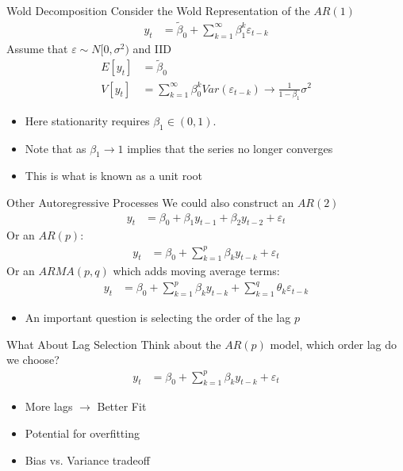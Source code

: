 \documentclass[aspectratio=169]{beamer}
\begin{document}
\begin{frame}{Wold Decomposition}
Consider the Wold Representation of the $AR(1)$
\begin{align*}
y_t &= \widetilde{\beta}_0 + \sum_{k=1}^{\infty} \beta_1^{k} \varepsilon_{t-k}
\end{align*}
Assume that $\varepsilon \sim N[0,\sigma^2)$ and IID
\begin{align*}
E[y_t] &= \widetilde{\beta}_0 \\
V[y_t] &= \sum_{k=1}^{\infty} \beta_0^{k} Var(\varepsilon_{t-k})  \rightarrow \frac{1}{1-\beta_1} \sigma^2 
\end{align*}
\begin{itemize}
    \item Here \alert{stationarity} requires $\beta_1 \in (0,1)$.
    \item Note that as $\beta_1 \rightarrow 1$ implies that the series no longer converges
    \item This is what is known as a \alert{unit root}
\end{itemize}
\end{frame}

\begin{frame}{Other Autoregressive Processes}
We could also construct an $AR(2)$
\begin{align*}
y_t &= \beta_0 + \beta_1 y_{t-1} + \beta_2 y_{t-2} + \varepsilon_{t}
\end{align*}
Or an $AR(p)$:
\begin{align*}
y_t &= \beta_0 + \sum_{k=1}^p \beta_k y_{t-k} + \varepsilon_{t}
\end{align*}
Or an $ARMA(p,q)$ which adds moving average terms:
\begin{align*}
y_t &= \beta_0 + \sum_{k=1}^p \beta_k y_{t-k} + \sum_{k=1}^q \theta_k \varepsilon_{t-k} 
\end{align*}
\begin{itemize}
\item An important question is \alert{selecting the order of the lag} $p$
\end{itemize}
\end{frame}


\begin{frame}{What About Lag Selection}
Think about the $AR(p)$ model, which order lag do we choose?
\begin{align*}
y_t &= \beta_0 + \sum_{k=1}^p \beta_k y_{t-k} + \varepsilon_{t}
\end{align*}
\begin{itemize}
  \item More lags $\rightarrow$ Better Fit
  \item Potential for \alert{overfitting}
  \item Bias vs. Variance tradeoff
\end{itemize}
\end{frame}
\end{document}
